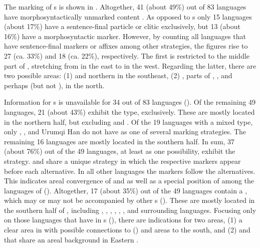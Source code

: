The marking of s is shown in . Altogether, 41 (about 49\%) out of 83 languages have morphosyntactically unmarked content . As opposed to s only 15 languages (about 17\%) have a sentence-final particle or clitic exclusively, but 13 (about 16\%) have a morphosyntactic marker. However, by counting all languages that have sentence-final markers or affixes among other strategies, the figures rise to 27 (ca. 33\%) and 18 (ca. 22\%), respectively. The first is restricted to the middle part of , stretching from  in the east to  in the west. Regarding the latter, there are two possible areas: (1)  and northern  in the southeast, (2) , parts of , , and perhaps  (but not ), in the north.

Information for s is unavailable for 34 out of 83 languages (). Of the remaining 49 languages, 21 (about 43\%) exhibit the  type, exclusively. These are mostly located in the northern half, but excluding  and . Of the 19 languages with a mixed type, only , , and Urumqi Han  do not have  as one of several marking strategies. The remaining 16 languages are mostly located in the southern half. In sum, 37 (about 76\%) out of the 49 languages, at least as one possibility, exhibit the  strategy.  and  share a unique  strategy in which the respective markers appear before each alternative. In all other languages the markers follow the alternatives. This indicates areal convergence of  and  as well as a special position of  among the languages of  (). Altogether, 17 (about 35\%) out of the 49 languages contain a , which may or may not be accompanied by other s (). These are mostly located in the southern half of , including , , , , , , and surrounding languages. Focusing only on those languages that have  in s (), there are indications for two areas, (1) a clear area in  with possible connections to  () and areas to the south, and (2)  and  that share an areal background in Eastern .

